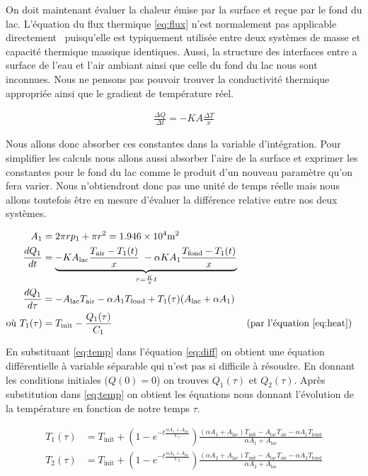 \documentclass[12pt]{article}
\numberwithin{figure}{section}
\numberwithin{table}{section}
\begin{document}
On doit maintenant \'evaluer la chaleur \'emise par la surface et re\c cue par le fond du lac.
L'\'equation du flux thermique \eqref{eq:flux} n'est normalement pas applicable
directement~\cite{HeatFlow} puisqu'elle est typiquement utilis\'ee entre deux syst\`emes de masse et
capacit\'e thermique massique identiques. Aussi, la structure des interfaces entre a surface de
l'eau et l'air ambiant ainsi que celle du fond du lac nous sont inconnues. Nous ne pensons pas
pouvoir trouver la conductivit\'e thermique appropri\'ee ainsi que le gradient de temp\'erature
r\'eel.

\begin{align}
    \frac{\Delta Q}{\Delta t} = -KA\frac{\Delta T}x \label{eq:flux}
\end{align}

Nous allons donc absorber ces constantes dans la variable d'int\'egration. Pour simplifier les
calculs nous allons aussi absorber l'aire de la surface et exprimer les constantes pour le fond du
lac comme le produit d'un nouveau param\`etre qu'on fera varier. Nous n'obtiendront donc pas une
unit\'e de temps r\'eelle mais nous allons toutefois \^etre en mesure d'\'evaluer la diff\'erence
relative entre nos deux syst\`emes.

\begin{align}
    A_1 &= 2\pi r p_1 + \pi r^2 = \num{1.946e4}\si{\square\meter}\notag\\
    \frac{dQ_1}{dt} &=
        \underbrace{-KA_\text{lac}\frac{T_\text{air}-T_1(t)}x\
            -\alpha KA_1\frac{T_\text{fond}-T_1(t)}x}_{\tau = \frac Kxt}\notag\\
    \frac{dQ_1}{d\tau} &= -A_\text{lac}T_\text{air}-\alpha A_1 T_\text{fond} + T_1(\tau)(A_\text{lac}+ \alpha A_1)\label{eq:diff}\\
    \text{o\`u } T_1(\tau) &= T_\text{init} - \frac{Q_1(\tau)}{C_1} \label{eq:temp}&&\text{(par l'\'equation \eqref{eq:heat})}
\end{align}

En substituant \eqref{eq:temp} dans l'\'equation \eqref{eq:diff} on obtient une \'equation
diff\'erentielle \`a variable s\'eparable qui n'est pas si difficile \`a r\'esoudre. En donnant les
conditions initiales ($Q(0) = 0$) on trouves $Q_1(\tau)$ et $Q_2(\tau)$. Apr\`es substitution dans
\eqref{eq:temp} on obtient les \'equations nous donnant l'\'evolution de la temp\'erature en fonction
de notre temps $\tau$.

\begin{align*}
    T_1(\tau) &=
        T_\text{init} +
            \left(1-e^{\textstyle -t\frac{\alpha A_1+A_\text{lac}}{C_1}}\right)
            \frac
                {(\alpha A_1+A_\text{lac})T_\text{init} - A_\text{lac} T_\text{air} - \alpha A_1 T_\text{fond}}
                {\alpha A_1+A_\text{lac}}\\
    T_2(\tau) &=
        T_\text{init} +
            \left(1-e^{\textstyle -t\frac{\alpha A_2+A_\text{lac}}{C_2}}\right)
            \frac
                {(\alpha A_2+A_\text{lac})T_\text{init} - A_\text{lac} T_\text{air} - \alpha A_2 T_\text{fond}}
                {\alpha A_2+A_\text{lac}}\\
\end{align*}
\end{document}
